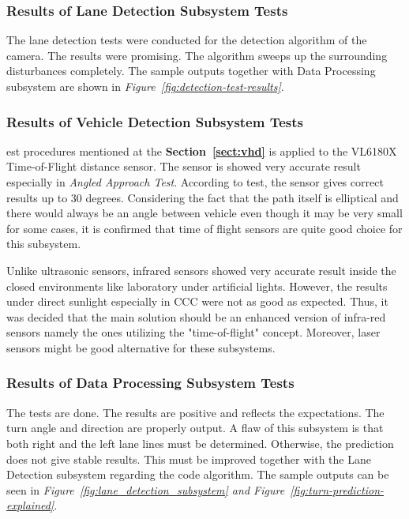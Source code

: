 \documentclass[a4paper,12pt]{article}
\begin{document}
	\subsubsection*{Results of Lane Detection Subsystem Tests}
		
	The lane detection tests were conducted for the detection algorithm of the camera. The results were promising. The algorithm sweeps up the surrounding disturbances completely. The sample outputs together with Data Processing subsystem are shown in \textit{Figure~\ref{fig:detection-test-results}}.
		
	
	
	\subsubsection*{Results of Vehicle Detection Subsystem Tests}
	
est procedures mentioned at the \textbf{Section~\ref{sect:vhd}} is applied to the VL6180X Time-of-Flight distance sensor. The sensor is showed very accurate result especially in \textit{Angled Approach Test}. According to test, the sensor gives correct results up to 30 degrees. Considering the fact that the path itself is elliptical and there would always be an angle between vehicle even though it may be very small for some cases, it is confirmed that time of flight sensors are quite good choice for this subsystem.
		
		 Unlike ultrasonic sensors, infrared sensors showed very accurate result inside the closed environments like laboratory under artificial lights. However, the results under direct sunlight especially in CCC were not as good as expected.  Thus, it was decided that the main solution should be an enhanced version of infra-red sensors namely the ones utilizing the "time-of-flight" concept. Moreover, laser sensors might be good alternative for these subsystems.
	
	
		
	
		
		
		
	\subsubsection*{Results of Data Processing Subsystem Tests}
	The tests are done. The results are positive and reflects the expectations. The turn angle and direction are properly output. A flaw of this subsystem is that both right and the left lane lines must be determined. Otherwise, the prediction does not give stable results. This must be improved together with the Lane Detection subsystem regarding the code algorithm.	The sample outputs can be seen in \textit{Figure~\ref{fig:lane_detection_subsystem} and Figure~\ref{fig:turn-prediction-explained}}.
	
\end{document}
